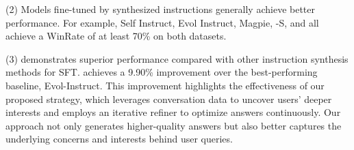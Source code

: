 (2) Models fine-tuned by synthesized instructions generally achieve better performance. For example, Self Instruct, Evol Instruct, Magpie, \ourmodel-S, and \ourmodel all achieve a WinRate of at least 70\% on both datasets. 

(3) \ourmodel demonstrates superior performance compared with other instruction synthesis methods for SFT. \ourmodel achieves a 9.90\% improvement over the best-performing baseline, Evol-Instruct. This improvement highlights the effectiveness of our proposed strategy, which leverages conversation data to uncover users' deeper interests and employs an iterative refiner to optimize answers continuously. Our approach not only generates higher-quality answers but also better captures the underlying concerns and interests behind user queries.


